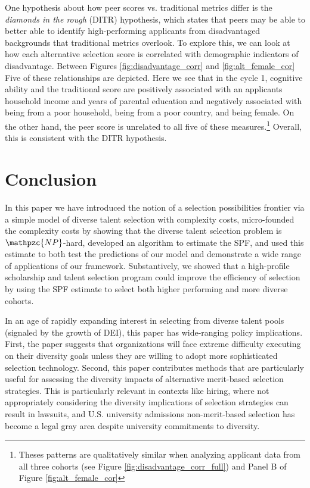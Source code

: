 One hypothesis about how peer scores vs. traditional metrics differ is the \emph{diamonds in the rough} (DITR) hypothesis, which states that peers may be able to better able to identify high-performing applicants from disadvantaged backgrounds that traditional metrics overlook. To explore this, we can look at how each alternative selection score is correlated with demographic indicators of disadvantage. Between Figures \ref{fig:disadvantage_corr} and \ref{fig:alt_female_cor} Five of these relationships are depicted. Here we see that in the cycle 1, cognitive ability and the traditional score are positively associated with an applicants household income and years of parental education and negatively associated with being from a poor household, being from a poor country, and being female. On the other hand, the peer score is unrelated to all five of these measures.\footnote{Theses patterns are qualitatively similar when analyzing applicant data from all three cohorts (see Figure \ref{fig:disadvantage_corr_full}) and Panel B of Figure \ref{fig:alt_female_cor}} Overall, this is consistent with the DITR hypothesis. 

\section{Conclusion} \label{sec:conclusion}

In this paper we have introduced the notion of a selection possibilities frontier via a simple model of diverse talent selection with complexity costs, micro-founded the complexity costs by showing that the diverse talent selection problem is $\mathpzc{NP}$-hard, developed an algorithm to estimate the SPF, and used this estimate to both test the predictions of our model and demonstrate a wide range of applications of our framework. Substantively, we showed that a high-profile scholarship and talent selection program could improve the efficiency of selection by using the SPF estimate to select both higher performing and more diverse cohorts. 

In an age of rapidly expanding interest in selecting from diverse talent pools (signaled by the growth of DEI), this paper has wide-ranging policy implications. First, the paper suggests that organizations will face extreme difficulty executing on their diversity goals unless they are willing to adopt more sophisticated selection technology. Second, this paper contributes methods that are particularly useful for assessing the diversity impacts of alternative merit-based selection strategies. This is particularly relevant in contexts like hiring, where not appropriately considering the diversity implications of selection strategies can result in lawsuits, and U.S. university admissions non-merit-based selection has become a legal gray area despite university commitments to diversity. 



